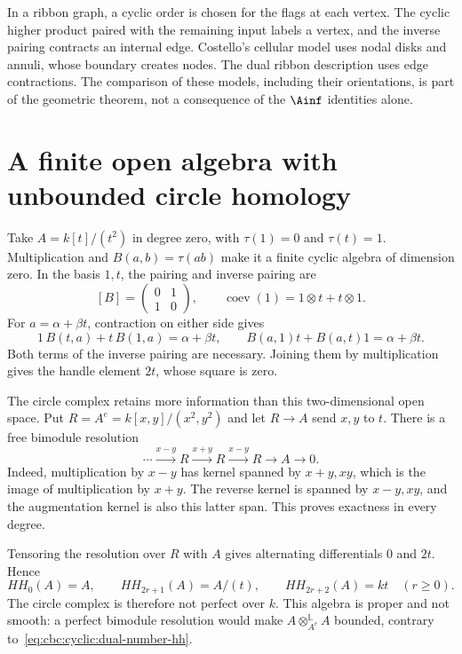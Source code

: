 In a ribbon graph, a cyclic order is chosen for the flags at each vertex.
The cyclic higher product paired with the remaining input labels a vertex, and the inverse pairing contracts an internal edge.
Costello's cellular model uses nodal disks and annuli, whose boundary creates nodes.
The dual ribbon description uses edge contractions.
The comparison of these models, including their orientations, is part of the geometric theorem, not a consequence of the $\Ainf$ identities alone.

\section{A finite open algebra with unbounded circle homology}

Take $A=k[t]/(t^2)$ in degree zero, with $\tau(1)=0$ and $\tau(t)=1$.
Multiplication and $B(a,b)=\tau(ab)$ make it a finite cyclic algebra of dimension zero.
In the basis $1,t$, the pairing and inverse pairing are
\[
 [B]=\begin{pmatrix}0&1\\1&0\end{pmatrix},
 \qquad \operatorname{coev}(1)=1\otimes t+t\otimes1.
\]
For $a=\alpha+\beta t$, contraction on either side gives
\[
 1\,B(t,a)+t\,B(1,a)=\alpha+\beta t,
 \qquad B(a,1)t+B(a,t)1=\alpha+\beta t.
\]
Both terms of the inverse pairing are necessary.
Joining them by multiplication gives the handle element $2t$, whose square is zero.

The circle complex retains more information than this two-dimensional open space.
Put $R=A^e=k[x,y]/(x^2,y^2)$ and let $R\to A$ send $x,y$ to $t$.
There is a free bimodule resolution
\begin{equation}\label{eq:cbc:cyclic:dual-number-resolution}
 \cdots\xrightarrow{x-y}R\xrightarrow{x+y}R
 \xrightarrow{x-y}R\longrightarrow A\longrightarrow0.
\end{equation}
Indeed, multiplication by $x-y$ has kernel spanned by $x+y,xy$, which is the image of multiplication by $x+y$.
The reverse kernel is spanned by $x-y,xy$, and the augmentation kernel is also this latter span.
This proves exactness in every degree.

Tensoring the resolution over $R$ with $A$ gives alternating differentials $0$ and $2t$.
Hence
\begin{equation}\label{eq:cbc:cyclic:dual-number-hh}
 HH_0(A)=A,\qquad
 HH_{2r+1}(A)=A/(t),\qquad
 HH_{2r+2}(A)=kt\quad(r\ge0).
\end{equation}
The circle complex is therefore not perfect over $k$.
This algebra is proper and not smooth: a perfect bimodule resolution would make $A\otimes_{A^e}^{\mathbb L}A$ bounded, contrary to~\eqref{eq:cbc:cyclic:dual-number-hh}.

